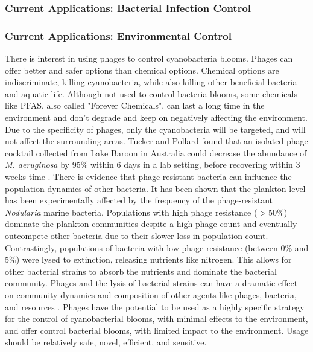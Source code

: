 \subsubsection{Current Applications: Bacterial Infection Control}


\subsubsection{Current Applications: Environmental Control}
There is interest in using phages to control cyanobacteria blooms. Phages can offer better and safer options than chemical options. Chemical options are indiscriminate, killing cyanobacteria, while also killing other beneficial bacteria and aquatic life. Although not used to control bacteria blooms, some chemicals like PFAS, also called "Forever Chemicals", can last a long time in the environment and don't degrade and keep on negatively affecting the environment. Due to the specificity of phages, only the cyanobacteria will be targeted, and will not affect the surrounding areas. Tucker and Pollard found that an isolated phage cocktail collected from Lake Baroon in Australia could decrease the abundance of \textit{M. aeruginosa} by 95\% within 6 days in a lab setting, before recovering within 3 weeks time \cite{tuckerIdentificationCyanophageMaLBP2005}. \newline 
There is evidence that phage-resistant bacteria can influence the population dynamics of other bacteria. It has been shown that the plankton level has been experimentally affected by the frequency of the phage-resistant \textit{Nodularia} marine bacteria. Populations with high phage resistance ($>50\%$) dominate the plankton communities despite a high phage count and eventually outcompete other bacteria due to their slower loss in population count. Contrastingly, populations of bacteria with low phage resistance (between 0\% and 5\%) were lysed to extinction, releasing nutrients like nitrogen. This allows for other bacterial strains to absorb the nutrients and dominate the bacterial community. Phages and the lysis of bacterial strains can have a dramatic effect on community dynamics and composition of other agents like phages, bacteria, and resources \cite{colomaFrequencyVirusresistantHosts2019}. Phages have the potential to be used as a highly specific strategy for the control of cyanobacterial blooms, with minimal effects to the environment, and offer control bacterial blooms, with limited impact to the environment. Usage should be relatively safe, novel, efficient, and sensitive. \newline 

